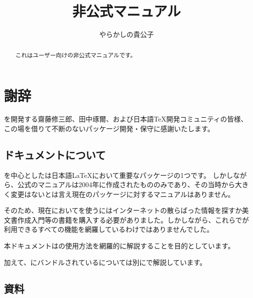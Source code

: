 \documentclass[uplatex, dvipdfmx, paper=a4paper, jis2004,
    fore-edge=19zw,
    line_length=35zw,
    sidenote_length=16zw,
    number_of_lines=38
  ]{jlreq}
\title{\pkg*{japanese-otf}非公式マニュアル}
\author{やらかしの貴公子}
\date{\docDate}
\begin{document}

\thispagestyle{fancy}
\fancyhead{}
\fancyfoot{\docLicense}
\pagestyle{cover}

\maketitle

\begin{abstract}
  これはユーザー向けの非公式マニュアルです。

  \vspace{0.7zw}
\end{abstract}

{
  \small
  \tableofcontents
}

\clearpage

\section*{謝辞}

を開発する齋藤修三郎{\氏}、田中琢爾{\氏}、および日本語{\TeX}開発コミュニティの皆様、この場を借りて不断のないパッケージ開発・保守に感謝いたします。

\vfil
\subsection*{ドキュメントについて}

を中心としたは日本語{\LaTeX}において重要なパッケージの1つです。
しかしながら、公式のマニュアルは2004年に作成されたもののみであり、その当時から大きく変更はないとは言え現在のパッケージに対するマニュアルはありません。

そのため、現在においてを使うにはインターネットの散らばった情報を探すか美文書作成入門等の書籍を購入する必要がありました。しかしながら、これらでが利用できるすべての機能を網羅しているわけではありませんでした。

本ドキュメントはの使用方法を網羅的に解説することを目的としています。

加えて、にバンドルされているについては別にで解説しています。

\vfil
\subsection*{資料}
\end{document}
